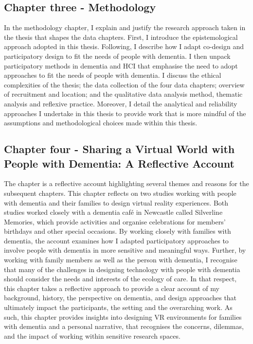 \subsection{Chapter three - Methodology}
\label{Intro:ChapterThree}
In the methodology chapter, I explain and justify the research approach taken in the thesis that shapes the data chapters. First, I introduce the epistemological approach adopted in this thesis. Following, I describe how I adapt co-design and participatory design to fit the needs of people with dementia. I then unpack participatory methods in dementia and HCI that emphasise the need to adopt approaches to fit the needs of people with dementia. I discuss the ethical complexities of the thesis; the data collection of the four data chapters; overview of recruitment and location; and the qualitative data analysis method, thematic analysis and reflexive practice. Moreover, I detail the analytical and reliability approaches I undertake in this thesis to provide work that is more mindful of the assumptions and methodological choices made within this thesis.

\subsection{Chapter four - Sharing a Virtual World with People with Dementia: A Reflective Account}
\label{Intro:ChapterFour}
The chapter is a reflective account highlighting several themes and reasons for the subsequent chapters. This chapter reflects on two studies working with people with dementia and their families to design virtual reality experiences. Both studies worked closely with a dementia café in Newcastle called Silverline Memories, which provide activities and organise celebrations for members' birthdays and other special occasions. By working closely with families with dementia, the account examines how I adapted participatory approaches to involve people with dementia in more sensitive and meaningful ways. Further, by working with family members as well as the person with dementia, I recognise that many of the challenges in designing technology with people with dementia should consider the needs and interests of the ecology of care. In that respect, this chapter takes a reflective approach to provide a clear account of my background, history, the perspective on dementia, and design approaches that ultimately impact the participants, the setting and the overarching work. As such, this chapter provides insights into designing VR environments for families with dementia and a personal narrative, that recognises the concerns, dilemmas, and the impact of working within sensitive research spaces.

